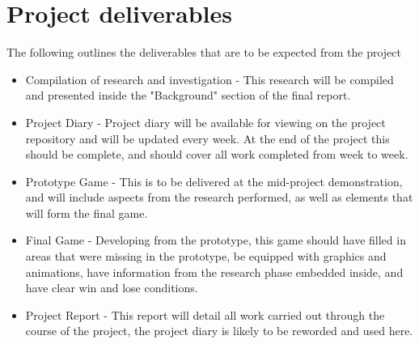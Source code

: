 \documentclass[11pt,fleqn,twoside]{article}
\begin{document}
\section{Project deliverables}
The following outlines the deliverables that are to be expected from the project
\begin{itemize}
    \item Compilation of research and investigation - This research will be compiled and presented inside the "Background" section of the final report.
    \item Project Diary - Project diary will be available for viewing on the project repository and will be updated every week. At the end of the project this should be complete, and should cover all work completed from week to week.
    \item Prototype Game - This is to be delivered at the mid-project demonstration, and will include aspects from the research performed, as well as elements that will form the final game.
    \item Final Game - Developing from the prototype, this game should have filled in areas that were missing in the prototype, be equipped with graphics and animations, have information from the research phase embedded inside, and have clear win and lose conditions.
    \item Project Report - This report will detail all work carried out through the course of the project, the project diary is likely to be reworded and used here.
\end{itemize}





\nocite{*} %

\newpage
{}

%
%

\renewcommand{\refname}{Annotated Bibliography}  %
\end{document}
